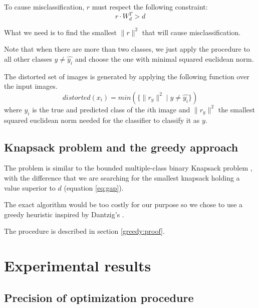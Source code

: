 \documentclass{article} %
\begin{document}
To cause misclassification, $r$ must respect the following constraint:
\begin{equation}
\label{eq:noise_threshold}
  r \cdot W_d^T > d
\end{equation}

What we need is to find the smallest $ \lVert{r} \rVert^2$ that will cause
misclassification. 

Note that when there are more than two classes, we just
apply the procedure to all other classes $y \neq \widehat{y_i}$ and choose the one with minimal squared euclidean norm.

The distorted set of images is generated by applying the following function over
the input images.
\begin{equation}
	\label{robustness}
	distorted(x_i) = min(\{\lVert{r_{y}} \rVert^2 \mid y \neq \widehat{y_i}\})
\end{equation}
where $\widehat{y_i}$ is the true and predicted class of the $i$th image and $\lVert{r_{y}} \rVert^2$ the smallest squared euclidean norm needed for the classifier to classify it as $y$.


\subsection{Knapsack problem and the greedy approach}

The problem is similar to the bounded multiple-class binary Knapsack problem
\citep{vanderbeck_extending_2002}, with the difference that we are searching
for the smallest knapsack holding a value superior to $d$ (equation
\ref{eq:gap}).

The exact algorithm would be too costly for our purpose so we chose to use a
greedy heuristic inspired by Dantzig's \citep{dantzig_discrete-variable_1957}.

The procedure is described in section \ref{greedy:proof}.



\section{Experimental results}




\subsection{Precision of optimization procedure}
\end{document}

